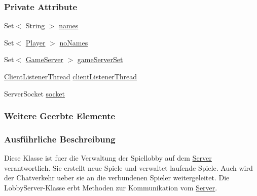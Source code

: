 \subsubsection*{Private Attribute}
\begin{DoxyCompactItemize}
\item 
\hypertarget{a00074_a410d47f6c4436004d6ac20c006a7f013}{Set$<$ String $>$ \hyperlink{a00074_a410d47f6c4436004d6ac20c006a7f013}{names}}\label{a00074_a410d47f6c4436004d6ac20c006a7f013}

\item 
\hypertarget{a00074_aa01c5e296e040ef9e00462b18ec2cbb0}{Set$<$ \hyperlink{a00076}{Player} $>$ \hyperlink{a00074_aa01c5e296e040ef9e00462b18ec2cbb0}{no\-Names}}\label{a00074_aa01c5e296e040ef9e00462b18ec2cbb0}

\item 
\hypertarget{a00074_a50829648a03f89348ae5d37a256aed98}{Set$<$ \hyperlink{a00072}{Game\-Server} $>$ \hyperlink{a00074_a50829648a03f89348ae5d37a256aed98}{game\-Server\-Set}}\label{a00074_a50829648a03f89348ae5d37a256aed98}

\item 
\hypertarget{a00074_aea765ab1affc1ca4aa581e91fe4dbf56}{\hyperlink{a00075}{Client\-Listener\-Thread} \hyperlink{a00074_aea765ab1affc1ca4aa581e91fe4dbf56}{client\-Listener\-Thread}}\label{a00074_aea765ab1affc1ca4aa581e91fe4dbf56}

\item 
\hypertarget{a00074_a7c2dae918c1b5f03cf1b5a7adb972529}{Server\-Socket \hyperlink{a00074_a7c2dae918c1b5f03cf1b5a7adb972529}{socket}}\label{a00074_a7c2dae918c1b5f03cf1b5a7adb972529}

\end{DoxyCompactItemize}
\subsubsection*{Weitere Geerbte Elemente}


\subsubsection{Ausführliche Beschreibung}
Diese Klasse ist fuer die Verwaltung der Spiellobby auf dem \hyperlink{a00077}{Server} verantwortlich. Sie erstellt neue Spiele und verwaltet laufende Spiele. Auch wird der Chatverkehr ueber sie an die verbundenen Spieler weitergeleitet. Die Lobby\-Server-\/\-Klasse erbt Methoden zur Kommunikation vom \hyperlink{a00077}{Server}. 

